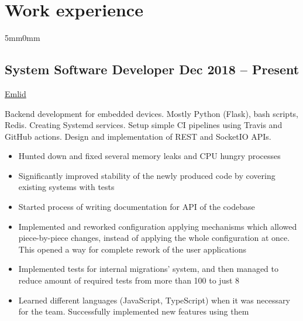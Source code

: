 \documentclass[10pt]{article}
\newcommand{\lmvalue}{5mm}
\newcommand{\rmvalue}{0mm}
\begin{document}
    \section*{Work experience}
    \begin{changemargin}{\lmvalue}{\rmvalue}
        \subsection*{System Software Developer \hfill {\color{gray}Dec 2018 –
        Present}}
        \href{https://emlid.com}{Emlid}

        Backend development for embedded devices.
        Mostly Python (Flask), bash scripts, Redis.
        Creating Systemd services.
        Setup simple CI pipelines using Travis and GitHub actions.
        Design and implementation of REST and SocketIO APIs.
        \begin{itemize}
            \item Hunted down and fixed several memory leaks and CPU hungry
            processes
            \item Significantly improved stability of the newly produced
            code by covering existing systems with tests
            \item Started process of writing documentation for API of the
            codebase
            \item Implemented and reworked configuration applying
            mechanisms which allowed piece-by-piece changes, instead of applying the whole
            configuration at once.
            This opened a way for complete rework of the user applications
            \item Implemented tests for internal migrations' system, and
            then managed to reduce amount of required tests from more than 100 to just 8
            \item Learned different languages (JavaScript, TypeScript) when
            it was necessary for the team.
            Successfully implemented new features using them
        \end{itemize}


\end{changemargin}
\end{document}

